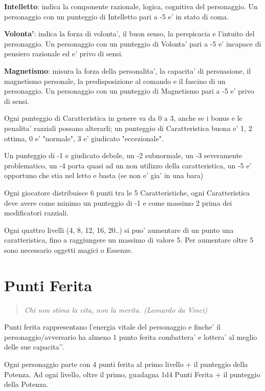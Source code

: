 \documentclass[a4paper,11pt,twoside,openany]{book}
\begin{document}
\textbf{Intelletto}: indica la componente razionale, logica, cognitiva del personaggio. Un personaggio con un punteggio di Intelletto pari a -5 e' in stato di coma.

\textbf{Volonta'}: indica la forza di volonta', il buon senso, la perspicacia e l'intuito del personaggio. Un personaggio con un punteggio di Volonta' pari a -5 e' incapace di pensiero razionale ed e' privo di sensi.

\textbf{Magnetismo}: misura la forza della personalita', la capacita' di persuasione, il magnetismo personale, la predisposizione al comando e il fascino di un personaggio. Un personaggio con un punteggio di Magnetismo pari a -5 e' privo di sensi.

\smallskip

Ogni punteggio di Caratteristica in genere va da 0 a 3, anche se i bonus e le penalita' razziali possano alterarli; un punteggio di Caratteristica buona e' 1, 2 ottima, 0 e' "normale", 3 e' giudicato "eccezionale".

Un punteggio di -1 e giudicato debole, un -2 subnormale, un -3 severamente problematico, un -4 porta quasi ad un non utilizzo della caratteristica, un -5 e' opportuno che stia nel letto e basta (se non e' gia' in una bara)

Ogni giocatore distribuisce 6 punti tra le 5 Caratteristiche, ogni Caratteristica deve avere come minimo un punteggio di -1 e come massimo 2 prima dei modificatori razziali.

Ogni quattro livelli (4, 8, 12, 16, 20..) si puo' aumentare di un punto una caratteristica, fino a raggiungere un massimo di valore 5. Per aumentare oltre 5 sono necessario oggetti magici o Essenze.


\section{Punti Ferita}

\begin{quote}\textit{Chi non stima la vita, non la merita. (Leonardo da Vinci)
}\end{quote}


Punti ferita rappresentano l’energia vitale del personaggio e finche’ il personaggio/avversario ha almeno 1 punto ferita combattera’ e lottera’ al meglio delle sue capacita'’.

Ogni personaggio parte con 4 punti ferita al primo livello + il punteggio della Potenza.
Ad ogni livello, oltre il primo, guadagna 1d4 Punti Ferita + il punteggio della Potenza. 
\end{document}

